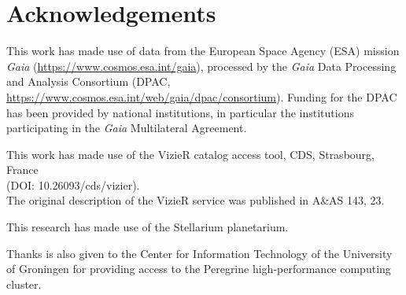\chapter*{Acknowledgements}
\setcounter{page}{2}

This work has made use of data from the European Space Agency (ESA) mission \textit{Gaia} (\url{https://www.cosmos.esa.int/gaia}), processed by the \textit{Gaia} Data Processing and Analysis Consortium (DPAC, \url{https://www.cosmos.esa.int/web/gaia/dpac/consortium}). Funding for the DPAC has been provided by national institutions, in particular the institutions participating in the \textit{Gaia} Multilateral Agreement.

\noindent This work has made use of the VizieR catalog access tool, CDS, Strasbourg, France\\ (DOI: 10.26093/cds/vizier).\\ The original description of the VizieR service was published in A\&AS 143, 23.

\noindent This research has made use of the Stellarium planetarium.

\noindent Thanks is also given to the Center for Information Technology of the University
of Groningen for providing access to the Peregrine high-performance computing
cluster.
